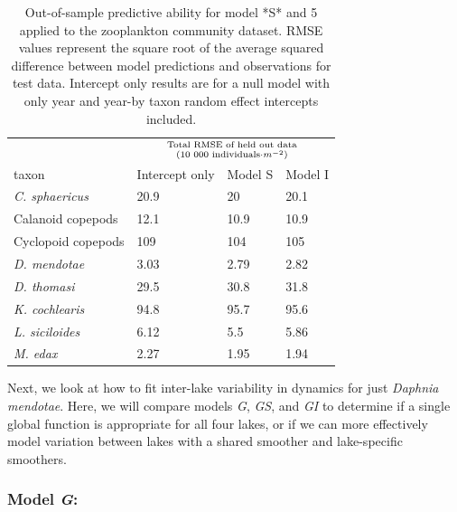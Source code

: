 \documentclass[12pt]{article}
\begin{document}
\begin{table}[t]

\caption{\label{tab:zoo_comm_outofsample_kable}Out-of-sample predictive ability for model *S* and 5 applied to the zooplankton community dataset. RMSE values represent the square root of the average squared difference between model predictions and observations for test data.  Intercept only results are for a null model with only year and year-by taxon random effect intercepts included.}
\centering
\begin{tabular}{llll}
\toprule
\multicolumn{1}{c}{ } & \multicolumn{3}{c}{\Large{${\text{Total RMSE of held out data}}\atop{(\text{10 000 individuals}\cdot m^{-2})}$}} \\
\cmidrule(l{2pt}r{2pt}){2-4}
taxon & Intercept only & Model S & Model I\\
\midrule
\em{C. sphaericus} & 20.9 & 20 & 20.1\\
Calanoid copepods & 12.1 & 10.9 & 10.9\\
Cyclopoid copepods & 109 & 104 & 105\\
\em{D. mendotae} & 3.03 & 2.79 & 2.82\\
\em{D. thomasi} & 29.5 & 30.8 & 31.8\\
\addlinespace
\em{K. cochlearis} & 94.8 & 95.7 & 95.6\\
\em{L. siciloides} & 6.12 & 5.5 & 5.86\\
\em{M. edax} & 2.27 & 1.95 & 1.94\\
\bottomrule
\end{tabular}
\end{table}

Next, we look at how to fit inter-lake variability in dynamics for just
\emph{Daphnia mendotae}. Here, we will compare models \emph{G},
\emph{GS}, and \emph{GI} to determine if a single global function is
appropriate for all four lakes, or if we can more effectively model
variation between lakes with a shared smoother and lake-specific
smoothers.

\subsubsection{\texorpdfstring{Model
\emph{G}:}{Model G:}}\label{model-g}
\end{document}
